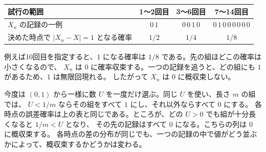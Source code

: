 \documentclass[a4paper,10pt,pdflatex,ja=standard,jafont=ipaex-type1,
  magstyle=real,scale=1]{bxjsarticle}
\begin{document}
\begin{center}
\renewcommand{\arraystretch}{1.25}
\begin{tabular}{lccc}
\toprule
試行の範囲 & 1～2回目 & 3～6回目 & 7～14回目 \\
\midrule
$X_n$ の記録の一例 & $0\,1$ & $0\,0\,1\,0$ & $0\,1\,0\,0\,0\,0\,0\,0$ \\
決めた時点で $|X_n-X|=1$ となる確率 & $1/2$ & $1/4$ & $1/8$ \\
\bottomrule
\end{tabular}
\end{center}

例えば10回目を指定すると、$1$ になる確率は $1/8$ である。先の組ほどこの確率は小さくなるので、
$X_n$ は $0$ に確率収束する。一つの記録を追うと、どの組にも $1$ があるため、$1$ は無限回現れる。
したがって $X_n$ は $0$ に概収束しない。

今度は $(0,1)$ から一様に数 $U$ を一度だけ選ぶ。同じ $U$ を使い、長さ $m$ の組では、
$U<1/m$ ならその組をすべて $1$ にし、それ以外ならすべて $0$ にする。
各時点の誤差確率は上の表と同じである。ところが、どの $U>0$ でも組が十分長くなると $1/m<U$ となり、
その先の記録はすべて $0$ になる。こちらの列は $0$ に概収束する。
各時点の差の分布が同じでも、一つの記録の中で値がどう並ぶかによって、概収束するかどうかは変わる。

\label{lastpage}
\end{document}
